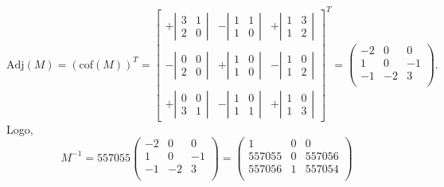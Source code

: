 \documentclass[oneside,a4paper,12pt]{article}
\theoremstyle{definition}
\theoremstyle{plain}
\theoremstyle{solu}
\theoremstyle{dotlessP}
\begin{document}
\[
\mathrm{Adj}(M) = (\mathrm{cof}(M))^T = \begin{bmatrix}
+\left| \begin{matrix} 3 & 1 \\ 2 & 0 \end{matrix} \right| &
-\left| \begin{matrix} 1 & 1 \\ 1 & 0 \end{matrix} \right| &
+\left| \begin{matrix} 1 & 3 \\ 1 & 2 \end{matrix} \right| \\
 & & \\
-\left| \begin{matrix} 0 & 0 \\ 2 & 0 \end{matrix} \right| &
+\left| \begin{matrix} 1 & 0 \\ 1 & 0 \end{matrix} \right| &
-\left| \begin{matrix} 1 & 0 \\ 1 & 2 \end{matrix} \right| \\
 & & \\
+\left| \begin{matrix} 0 & 0 \\ 3 & 1 \end{matrix} \right| &
-\left| \begin{matrix} 1 & 0 \\ 1 & 1 \end{matrix} \right| &
+\left| \begin{matrix} 1 & 0 \\ 1 & 3 \end{matrix} \right|
\end{bmatrix}^T = \begin{pmatrix}
-2 & 0 & 0 \\
1 & 0 & -1 \\
-1 & -2 & 3\\
\end{pmatrix}.
\]
Logo,
\[
M^{-1} = 557055 \begin{pmatrix}
-2 & 0 & 0 \\
1 & 0 & -1 \\
-1 & -2 & 3\\
\end{pmatrix} = \begin{pmatrix}
1 & 0 & 0 \\
557055 & 0 & 557056 \\
557056 & 1 & 557054\\
\end{pmatrix}
\]
\end{document}
